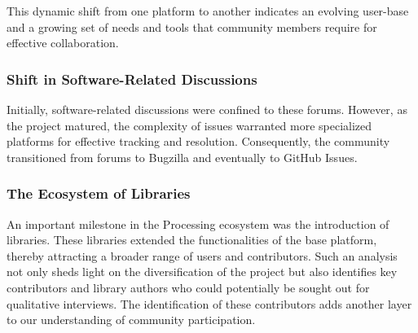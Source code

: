\documentclass{article}
\begin{document}


This dynamic shift from one platform to another indicates an evolving user-base and a growing set of needs and tools that community members require for effective collaboration.

\subsubsection*{Shift in Software-Related Discussions}

Initially, software-related discussions were confined to these forums. However, as the project matured, the complexity of issues warranted more specialized platforms for effective tracking and resolution. Consequently, the community transitioned from forums to Bugzilla \parencite{BugzillaArchiveProcessing} and eventually to GitHub Issues\parencite{ProcessingProcessingSource}\parencite{ProcessingProcessing4Processing}. 

\subsubsection*{The Ecosystem of Libraries}
An important milestone in the Processing ecosystem was the introduction of libraries. These libraries extended the functionalities of the base platform, thereby attracting a broader range of users and contributors. Such an analysis not only sheds light on the diversification of the project but also identifies key contributors and library authors who could potentially be sought out for qualitative interviews. The identification of these contributors adds another layer to our understanding of community participation.








\end{document}
